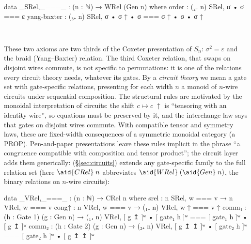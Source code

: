 \begin{center}
\begin{minipage}[c]{0.58\linewidth}
\begingroup\setlength{\mathindent}{0pt}
\begin{code}
data _SRel,_===_ : (n : ℕ) → WRel (Gen n) where
  order       : (₂₊ n) SRel, σ • σ === ε
  yang-baxter : (₃₊ n) SRel, σ • σ ↑ • σ === σ ↑ • σ • σ ↑
\end{code}
\endgroup
\end{minipage}\hspace{2.5em}%
\begin{minipage}[c]{0.28\linewidth}\centering
  \\[4pt]
\end{minipage}
\end{center}

\noindent These two axioms are two thirds of the Coxeter presentation of
$S_n$: $\sigma^2 = \varepsilon$ and the braid (Yang--Baxter) relation.
The third Coxeter relation, that swaps on disjoint wires commute, is not
specific to permutations: it is one of the relations every circuit
theory needs, whatever its gates.  By a
\emph{circuit theory} we mean a gate set with gate-specific relations,
presenting for each width $n$ a monoid of $n$-wire circuits under
sequential composition.  The structural rules are motivated by the
monoidal interpretation of circuits: the shift $c \mapsto c\;{\uparrow}$ is
``tensoring with an identity wire'', so equations must be preserved by
it, and the interchange law says that gates on disjoint wires commute.
With compatible tensor and symmetry laws, these are fixed-width
consequences of a symmetric monoidal category (a PROP).
Pen-and-paper presentations leave these rules implicit in the phrase ``a
congruence compatible with composition and tensor product''; the circuit
layer adds them generically:  (\S\ref{sec:circuits}) extends any
gate-specific family to the full relation set 
(here $\aid{CRel}\;n$ abbreviates $\aid{WRel}\;(\aid{Gen}\;n)$, the
binary relations on $n$-wire circuits):

\begin{code}
data _VRel,_===_ : (n : ℕ) → CRel n where
  srel  : n SRel, w === v → n VRel, w === v
  cong↑ : n VRel, w === v → (₁₊ n) VRel, w ↑ === v ↑
  comm₁ : (h : Gate 1) (g : Gen n) → (₁₊ n) VRel, [ g ↥ ]ʷ • [ gate₁ h ]ʷ === [ gate₁ h ]ʷ • [ g ↥ ]ʷ
  comm₂ : (h : Gate 2) (g : Gen n) → (₂₊ n) VRel, [ g ↥ ↥ ]ʷ • [ gate₂ h ]ʷ === [ gate₂ h ]ʷ • [ g ↥ ↥ ]ʷ
\end{code}

